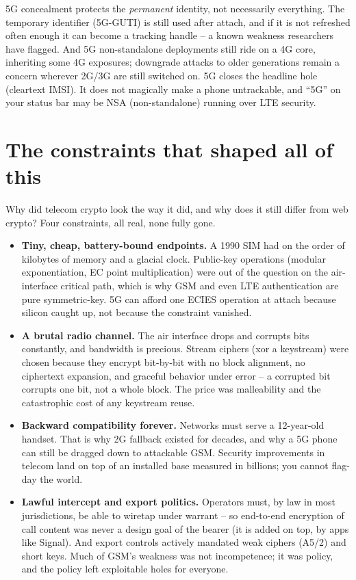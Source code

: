 \begin{trapbox}
5G concealment protects the \emph{permanent} identity, not necessarily everything. The temporary identifier (5G-GUTI) is still used after attach, and if it is not refreshed often enough it can become a tracking handle -- a known weakness researchers have flagged. And 5G non-standalone deployments still ride on a 4G core, inheriting some 4G exposures; downgrade attacks to older generations remain a concern wherever 2G/3G are still switched on. 5G closes the headline hole (cleartext IMSI). It does not magically make a phone untrackable, and ``5G'' on your status bar may be NSA (non-standalone) running over LTE security.
\end{trapbox}

\section{The constraints that shaped all of this}
\label{ch29:constraints}

Why did telecom crypto look the way it did, and why does it still differ from web crypto? Four constraints, all real, none fully gone.

\begin{itemize}
  \item \textbf{Tiny, cheap, battery-bound endpoints.} A 1990 SIM had on the order of kilobytes of memory and a glacial clock. Public-key operations (modular exponentiation, EC point multiplication) were out of the question on the air-interface critical path, which is why GSM and even LTE authentication are pure symmetric-key. 5G can afford one ECIES operation at attach because silicon caught up, not because the constraint vanished.
  \item \textbf{A brutal radio channel.} The air interface drops and corrupts bits constantly, and bandwidth is precious. Stream ciphers (xor a keystream) were chosen because they encrypt bit-by-bit with no block alignment, no ciphertext expansion, and graceful behavior under error -- a corrupted bit corrupts one bit, not a whole block. The price was malleability and the catastrophic cost of any keystream reuse.
  \item \textbf{Backward compatibility forever.} Networks must serve a 12-year-old handset. That is why 2G fallback existed for decades, and why a 5G phone can still be dragged down to attackable GSM. Security improvements in telecom land on top of an installed base measured in billions; you cannot flag-day the world.
  \item \textbf{Lawful intercept and export politics.} Operators must, by law in most jurisdictions, be able to wiretap under warrant -- so end-to-end encryption of call content was never a design goal of the bearer (it is added on top, by apps like Signal). And export controls actively mandated weak ciphers (A5/2) and short keys. Much of GSM's weakness was not incompetence; it was policy, and the policy left exploitable holes for everyone.
\end{itemize}

